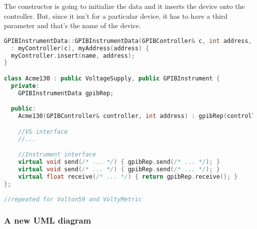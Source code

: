 The constructor is going to initialize the data and it inserts the device onto the controller. But, since it isn't for a particular device, it has to have a third parameter and that's the name of the device.

\begin{lstlisting}[language=C++]
GPIBInstrumentData::GPIBInstrumentData(GPIBController& c, int address, const char* name) 
  : myController(c), myAddress(address) {
  myController.insert(name, address);
}

class Acme130 : public VoltageSupply, public GPIBInstrument {
  private:
    GPIBInstrumentData gpibRep;

  public:
    Acme130(GPIBController& controller, int address) : gpibRep(controller, address, "Acme130") { }

    //VS interface
    //...

    //Instrument interface
    virtual void send(/* ... */) { gpibRep.send(/* ... */); }   
    virtual void send(/* ... */) { gpibRep.send(/* ... */); }
    virtual float receive(/* ... */) { return gpibRep.receive(); }
};

//repeated for Volton59 and VoltyMetric
\end{lstlisting}

\subsubsection{A new UML diagram}

